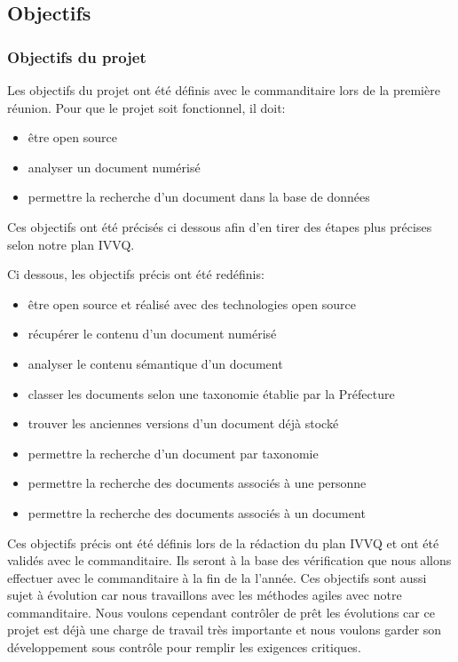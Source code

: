 
\subsection{Objectifs}
\subsubsection{Objectifs du projet}

Les objectifs du projet ont été définis avec le commanditaire lors de la première réunion.
Pour que le projet soit fonctionnel, il doit:
\begin{itemize}
\item être open source
\item analyser un document numérisé
\item permettre la recherche d'un document dans la base de données

\end{itemize}

Ces objectifs ont été précisés ci dessous afin d'en tirer des étapes plus précises selon notre plan IVVQ\@.  

Ci dessous, les objectifs précis ont été redéfinis:
\begin{itemize}
\item être open source et réalisé avec des technologies open source
\item récupérer le contenu d'un document numérisé
\item analyser le contenu sémantique d’un document
\item classer les documents selon une taxonomie établie par la Préfecture
\item trouver les anciennes versions d’un document déjà stocké
\item permettre la recherche d’un document par taxonomie
\item permettre la recherche des documents associés à une personne
\item permettre la recherche des documents associés à un document
\end{itemize}


Ces objectifs précis ont été définis lors de la rédaction du plan IVVQ et ont été validés avec le commanditaire.
Ils seront à la base des vérification que nous allons effectuer avec le commanditaire à la fin de la l'année.
Ces objectifs sont aussi sujet à évolution car nous travaillons avec les méthodes agiles avec notre commanditaire.
Nous voulons cependant contrôler de prêt les évolutions car ce projet est déjà une charge de travail très importante et nous voulons garder son développement sous contrôle pour remplir les exigences critiques.


